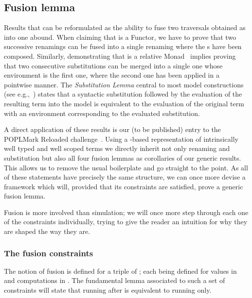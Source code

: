 
\subsection{Fusion lemma}\label{section:fusion}

Results that can be reformulated as the ability to fuse two traversals
obtained as \semrec{} into one abound. When claiming that  is
a Functor, we have to prove that two successive renamings can be fused into
a single renaming where the s have been composed. Similarly,
demonstrating that  is a relative Monad~\cite{JFR4389} implies proving
that two consecutive substitutions can be merged into a single one whose
environment is the first one, where the second one has been applied in a
pointwise manner. The \emph{Substitution Lemma} central
to most model constructions (see e.g.,~\cite{mitchell1991kripke}) states
that a syntactic substitution followed by the evaluation of the resulting term
into the model is equivalent to the evaluation of the original term with an
environment corresponding to the evaluated substitution.

A direct application of these results is our (to be published) entry to the
POPLMark Reloaded challenge~\citeyear{poplmarkreloaded}. Using a -based
representation of intrinsically well typed and well scoped terms we directly inherit
not only renaming and substitution but also all four fusion lemmas as corollaries
of our generic results. This allows us to remove the usual boilerplate
and go straight to the point.
As all of these statements have precisely the same structure, we can
once more devise a framework which will, provided that its constraints are
satisfied, prove a generic fusion lemma.

Fusion is more involved than simulation; we will once more step through
each one of the constraints individually, trying to give the reader an intuition
for why they are shaped the way they are.

\subsubsection{The fusion constraints}

The notion of fusion is defined for a triple of ; each 
being defined for values in  and computations in . The
fundamental lemma associated to such a set of constraints will state that
running  after  is equivalent to running  only.

